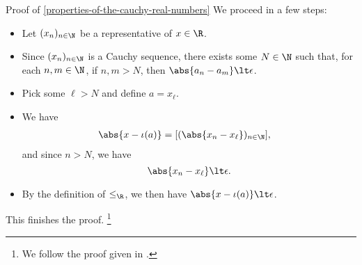 \begin{Proof}{Proof of \cref{properties-of-the-cauchy-real-numbers}}
    We proceed in a few steps:
    \begin{itemize}
        \item Let $(x_{n})_{n\in\N}$ be a representative of $x\in\R$.
        \item Since $(x_{n})_{n\in\N}$ is a Cauchy sequence, there exists some $N\in\N$ such that, for each $n,m\in\N$, if $n,m\gt N$, then $\abs{a_{n}-a_{m}}\lt\epsilon$.
        \item Pick some $\ell\gt N$ and define $a=x_{\ell}$.
        \item We have
            \begin{align*}
                \abs{x-\iota(a)} &= [(\abs{x_{n}-x_{\ell}})_{n\in\N}],
            \end{align*}
            and since $n\gt N$, we have
            \[
                \abs{x_{n}-x_{\ell}}%
                \lt%
                \epsilon.%
            \]%
        \item By the definition of $\leq_{\R}$, we then have $\abs{x-\iota(a)}\lt\epsilon$.
    \end{itemize}
    This finishes the proof.%
    \footnote{%
        We follow the proof given in \cite[Theorem 4.12]{kemp:cauchy-s-construction-of-r}.
    }%


\end{Proof}

